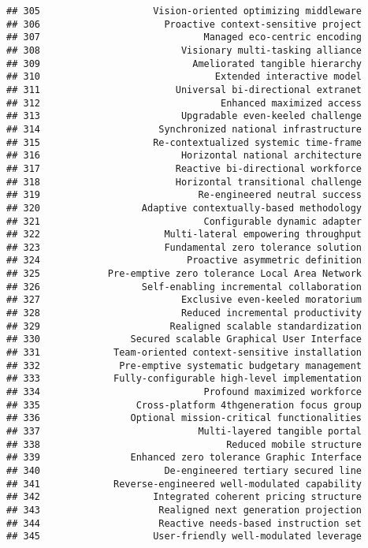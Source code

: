 \documentclass[
]{article}
\begin{document}
\begin{verbatim}
## 305                    Vision-oriented optimizing middleware
## 306                      Proactive context-sensitive project
## 307                             Managed eco-centric encoding
## 308                         Visionary multi-tasking alliance
## 309                           Ameliorated tangible hierarchy
## 310                               Extended interactive model
## 311                        Universal bi-directional extranet
## 312                                Enhanced maximized access
## 313                         Upgradable even-keeled challenge
## 314                     Synchronized national infrastructure
## 315                    Re-contextualized systemic time-frame
## 316                         Horizontal national architecture
## 317                        Reactive bi-directional workforce
## 318                        Horizontal transitional challenge
## 319                            Re-engineered neutral success
## 320                  Adaptive contextually-based methodology
## 321                             Configurable dynamic adapter
## 322                      Multi-lateral empowering throughput
## 323                      Fundamental zero tolerance solution
## 324                          Proactive asymmetric definition
## 325            Pre-emptive zero tolerance Local Area Network
## 326                  Self-enabling incremental collaboration
## 327                         Exclusive even-keeled moratorium
## 328                         Reduced incremental productivity
## 329                       Realigned scalable standardization
## 330                Secured scalable Graphical User Interface
## 331             Team-oriented context-sensitive installation
## 332              Pre-emptive systematic budgetary management
## 333             Fully-configurable high-level implementation
## 334                             Profound maximized workforce
## 335                 Cross-platform 4thgeneration focus group
## 336                Optional mission-critical functionalities
## 337                            Multi-layered tangible portal
## 338                                 Reduced mobile structure
## 339                Enhanced zero tolerance Graphic Interface
## 340                      De-engineered tertiary secured line
## 341             Reverse-engineered well-modulated capability
## 342                    Integrated coherent pricing structure
## 343                     Realigned next generation projection
## 344                     Reactive needs-based instruction set
## 345                    User-friendly well-modulated leverage

\end{verbatim}
\end{document}
